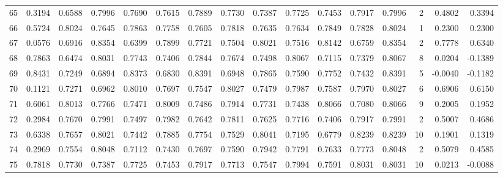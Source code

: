 \begin{tabular}{lrrrrrrrrrrrrrrr}
65  &      0.3194 &  0.6588 &  0.7996 &  0.7690 &  0.7615 &  0.7889 &  0.7730 &  0.7387 &  0.7725 &  0.7453 &   0.7917 &     0.7996 &      2 &                    0.4802 &                     0.3394 \\
66  &      0.5724 &  0.8024 &  0.7645 &  0.7863 &  0.7758 &  0.7605 &  0.7818 &  0.7635 &  0.7634 &  0.7849 &   0.7828 &     0.8024 &      1 &                    0.2300 &                     0.2300 \\
67  &      0.0576 &  0.6916 &  0.8354 &  0.6399 &  0.7899 &  0.7721 &  0.7504 &  0.8021 &  0.7516 &  0.8142 &   0.6759 &     0.8354 &      2 &                    0.7778 &                     0.6340 \\
68  &      0.7863 &  0.6474 &  0.8031 &  0.7743 &  0.7406 &  0.7844 &  0.7674 &  0.7498 &  0.8067 &  0.7115 &   0.7379 &     0.8067 &      8 &                    0.0204 &                    -0.1389 \\
69  &      0.8431 &  0.7249 &  0.6894 &  0.8373 &  0.6830 &  0.8391 &  0.6948 &  0.7865 &  0.7590 &  0.7752 &   0.7432 &     0.8391 &      5 &                   -0.0040 &                    -0.1182 \\
70  &      0.1121 &  0.7271 &  0.6962 &  0.8010 &  0.7697 &  0.7547 &  0.8027 &  0.7479 &  0.7987 &  0.7587 &   0.7970 &     0.8027 &      6 &                    0.6906 &                     0.6150 \\
71  &      0.6061 &  0.8013 &  0.7766 &  0.7471 &  0.8009 &  0.7486 &  0.7914 &  0.7731 &  0.7438 &  0.8066 &   0.7080 &     0.8066 &      9 &                    0.2005 &                     0.1952 \\
72  &      0.2984 &  0.7670 &  0.7991 &  0.7497 &  0.7982 &  0.7642 &  0.7811 &  0.7625 &  0.7716 &  0.7406 &   0.7917 &     0.7991 &      2 &                    0.5007 &                     0.4686 \\
73  &      0.6338 &  0.7657 &  0.8021 &  0.7442 &  0.7885 &  0.7754 &  0.7529 &  0.8041 &  0.7195 &  0.6779 &   0.8239 &     0.8239 &     10 &                    0.1901 &                     0.1319 \\
74  &      0.2969 &  0.7554 &  0.8048 &  0.7112 &  0.7430 &  0.7697 &  0.7590 &  0.7942 &  0.7791 &  0.7633 &   0.7773 &     0.8048 &      2 &                    0.5079 &                     0.4585 \\
75  &      0.7818 &  0.7730 &  0.7387 &  0.7725 &  0.7453 &  0.7917 &  0.7713 &  0.7547 &  0.7994 &  0.7591 &   0.8031 &     0.8031 &     10 &                    0.0213 &                    -0.0088 \\

\end{tabular}
